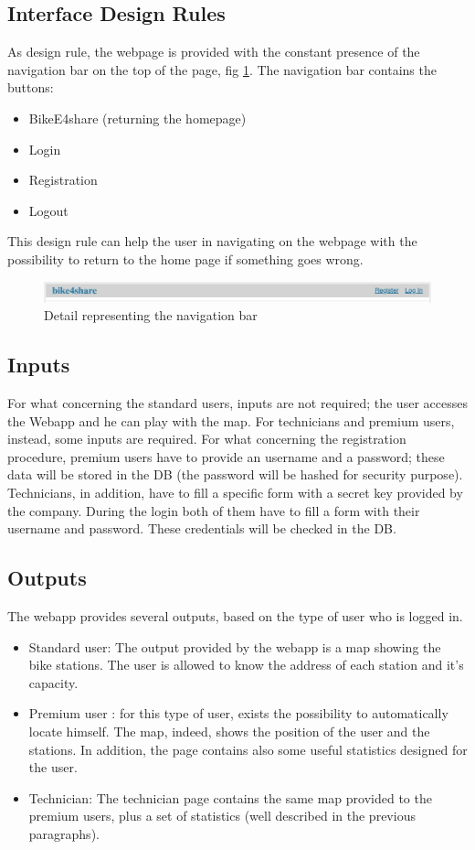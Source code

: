\documentclass{article}
\begin{document}
\subsection{Interface Design Rules}
As design rule, the webpage is provided with the constant presence of the navigation bar on the top of the page, fig \ref{fig:navbar}. The navigation bar contains the buttons:
\begin{itemize}
    \item BikeE4share (returning the homepage)
    \item Login
    \item Registration
    \item Logout
\end{itemize}
This design rule can help the user in navigating on the webpage with the possibility to return to the home page if something goes wrong.

\begin{figure}[H]
    \centering
    \includegraphics[width=1\linewidth]{image/navbar.png}
    \caption{Detail representing the navigation bar}
    \label{fig:navbar}
\end{figure}

\subsection{Inputs}
For what concerning the standard users, inputs are not required; the user accesses the Webapp and he can play with the map. 
For technicians and premium users, instead, some inputs are required. For what concerning the registration procedure, premium users have to provide an username and a password; these data will be stored in the DB (the password will be hashed for security purpose). Technicians, in addition, have to fill a specific form with a secret key provided by the company. 
During the login both of them have to fill a form with their username and password. These credentials will be checked in the DB.
\subsection{Outputs}
The webapp provides several outputs, based on the type of user who is logged in.
\begin{itemize}
    \item Standard user: The output provided by the webapp is a map showing the bike stations. The user is allowed to know the address of each station and it's capacity.
    \item Premium user : for this type of user, exists the possibility to automatically locate himself. The map, indeed, shows the position of the user and the stations. In addition, the page contains also some useful statistics designed for the user.
    \item Technician: The technician page contains the same map provided to the premium users, plus a set of statistics (well described in the previous paragraphs).
\end{itemize}
\end{document}
